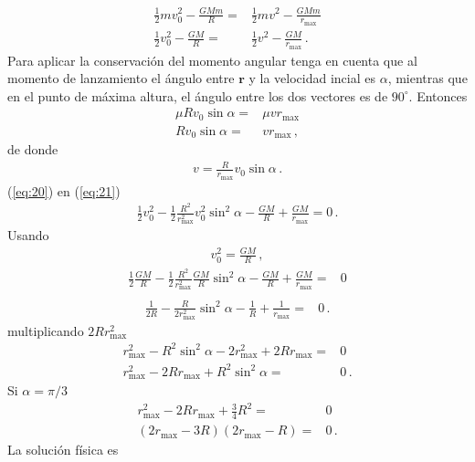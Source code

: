 \begin{itemize}
\begin{frame}
  \begin{align}
    \label{eq:21}
    \frac{1}{2}m v_0^2-\frac{GMm}{R}=&\frac{1}{2}mv^2-\frac{GMm}{r_{\text{max}}}\nonumber\\
    \frac{1}{2}v_0^2-\frac{GM}{R}=&\frac{1}{2}v^2-\frac{GM}{r_{\text{max}}}\,.
  \end{align}
Para aplicar la conservación del momento angular tenga en cuenta que al momento de lanzamiento el ángulo entre $\mathbf{r}$ y la velocidad incial es $\alpha$, mientras que en el punto de máxima altura, el ángulo entre los dos vectores es de $90^\circ$. Entonces
  \begin{align}
    \mu R v_0 \sin\alpha=&\mu v r_{\text{max}}\nonumber\\
     R v_0 \sin\alpha=&v r_{\text{max}}\,,
  \end{align}
de donde
\begin{align}
  \label{eq:20}
  v=\frac{R}{r_{\text{max}}}v_0 \sin\alpha\,.
\end{align}
(\ref{eq:20}) en (\ref{eq:21})
\begin{align}
  \frac{1}{2}v_0^2-\frac{1}{2}\frac{R^2}{r^2_{\text{max}}}v^2_0 \sin^2\alpha-\frac{GM}{R}+\frac{GM}{r_{\text{max}}}=0\,.
\end{align}
Usando
\begin{align}
  v_0^2=\frac{GM}{R}\,,
\end{align}
\begin{align}
    \frac{1}{2}\frac{GM}{R}-\frac{1}{2}\frac{R^2}{r^2_{\text{max}}}\frac{GM}{R} \sin^2\alpha-\frac{GM}{R}+\frac{GM}{r_{\text{max}}}=&0\nonumber\\
\end{align}
\begin{align}
      \frac{1}{2R}-\frac{R}{2r^2_{\text{max}}} \sin^2\alpha-\frac{1}{R}+\frac{1}{r_{\text{max}}}=&0\,.
\end{align}
multiplicando $2R r_{\text{max}}^2$ 
\begin{align}
 r_{\text{max}}^2-{R^2} \sin^2\alpha-2 r^2_{\text{max}}+2Rr_{\text{max}}=&0\nonumber\\
   r_{\text{max}}^2-2Rr_{\text{max}}+R^2 \sin^2\alpha=&0\,.
\end{align}
Si $\alpha=\pi/3$
\begin{align}
r_{\text{max}}^2-2Rr_{\text{max}}+\frac{3}{4}R^2 =&0\nonumber\\
(2r_{\text{max}}-3R)(2r_{\text{max}}-R)=&0\,.
\end{align}
La solución física es
\begin{align}

\end{align}
\end{frame}
\end{itemize}
